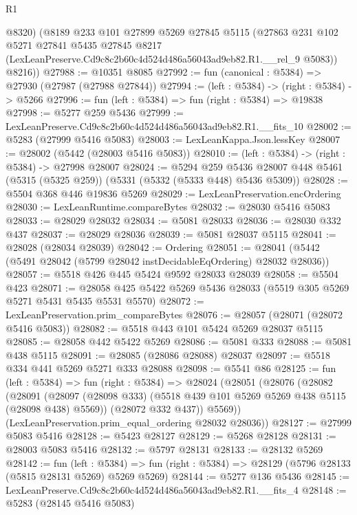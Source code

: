 \begin{lexlean}{R1}
\begin{coremodule}
        @8320)
      (@8189
        @233
        @101
        @27899
        @5269
        @27845
        @5115
        (@27863
          @231
          @102
          @5271
          @27841
          @5435
          @27845
          @8217
          (LexLeanPreserve.Cd9c8c2b60c4d524d486a56043ad9eb82.R1.__rel_9 @5083))
        @8216))
@27988 := @10351 @8085
@27992 := fun (canonical : @5384) => @27930 (@27987 (@27988 @27844))
@27994 := (left : @5384) -> (right : @5384) -> @5266
@27996 := fun (left : @5384) => fun (right : @5384) => @19838
@27998 := @5277 @259 @5436
@27999 := LexLeanPreserve.Cd9c8c2b60c4d524d486a56043ad9eb82.R1.__fits_10
@28002 := @5283 (@27999 @5416 @5083)
@28003 := LexLeanKappa.Json.lessKey
@28007 := @28002 (@5442 (@28003 @5416 @5083))
@28010 := (left : @5384) -> (right : @5384) -> @27998 @28007
@28024 := @5294
    @259
    @5436
    @28007
    @448
    @5461
    (@5315 (@5325 @259))
    (@5331 (@5332 (@5333 @448) @5436 @5309))
@28028 := @5504 @368 @446 @19836 @5269
@28029 := LexLeanPreservation.encOrdering
@28030 := LexLeanRuntime.compareBytes
@28032 := @28030 @5416 @5083
@28033 := @28029 @28032
@28034 := @5081 @28033
@28036 := @28030 @332 @437
@28037 := @28029 @28036
@28039 := @5081 @28037 @5115
@28041 := @28028 (@28034 @28039)
@28042 := Ordering
@28051 := @28041 (@5442 (@5491 @28042 (@5799 @28042 instDecidableEqOrdering) @28032 @28036))
@28057 := @5518 @426 @445 @5424 @9592 @28033 @28039
@28058 := @5504 @423
@28071 := @28058 @425 @5422 @5269 @5436 @28033 (@5519 @305 @5269 @5271 @5431 @5435 @5531 @5570)
@28072 := LexLeanPreservation.prim_compareBytes
@28076 := @28057 (@28071 (@28072 @5416 @5083))
@28082 := @5518 @443 @101 @5424 @5269 @28037 @5115
@28085 := @28058 @442 @5422 @5269
@28086 := @5081 @333
@28088 := @5081 @438 @5115
@28091 := @28085 (@28086 @28088) @28037
@28097 := @5518 @334 @441 @5269 @5271 @333 @28088
@28098 := @5541 @86
@28125 := fun (left : @5384) =>
  fun (right : @5384) =>
  @28024
    (@28051
      (@28076
        (@28082
          (@28091
            (@28097 (@28098 @333) (@5518 @439 @101 @5269 @5269 @438 @5115 (@28098 @438) @5569))
            (@28072 @332 @437))
          @5569))
      (LexLeanPreservation.prim_equal_ordering @28032 @28036))
@28127 := @27999 @5083 @5416
@28128 := @5423 @28127
@28129 := @5268 @28128
@28131 := @28003 @5083 @5416
@28132 := @5797 @28131
@28133 := @28132 @5269
@28142 := fun (left : @5384) =>
  fun (right : @5384) => @28129 (@5796 @28133 (@5815 @28131 @5269) @5269 @5269)
@28144 := @5277 @136 @5436
@28145 := LexLeanPreserve.Cd9c8c2b60c4d524d486a56043ad9eb82.R1.__fits_4
@28148 := @5283 (@28145 @5416 @5083)

\end{coremodule}
\end{lexlean}
